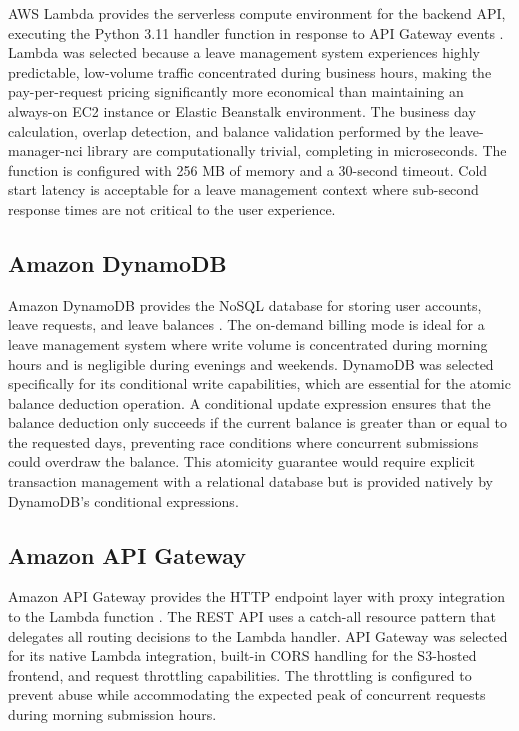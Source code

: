 \documentclass[conference]{IEEEtran}
\begin{document}
AWS Lambda provides the serverless compute environment for the backend API, executing the Python 3.11 handler function in response to API Gateway events \cite{awslambda}. Lambda was selected because a leave management system experiences highly predictable, low-volume traffic concentrated during business hours, making the pay-per-request pricing significantly more economical than maintaining an always-on EC2 instance or Elastic Beanstalk environment. The business day calculation, overlap detection, and balance validation performed by the leave-manager-nci library are computationally trivial, completing in microseconds. The function is configured with 256 MB of memory and a 30-second timeout. Cold start latency is acceptable for a leave management context where sub-second response times are not critical to the user experience.

\subsection{Amazon DynamoDB}

Amazon DynamoDB provides the NoSQL database for storing user accounts, leave requests, and leave balances \cite{awsdynamodb}. The on-demand billing mode is ideal for a leave management system where write volume is concentrated during morning hours and is negligible during evenings and weekends. DynamoDB was selected specifically for its conditional write capabilities, which are essential for the atomic balance deduction operation. A conditional update expression ensures that the balance deduction only succeeds if the current balance is greater than or equal to the requested days, preventing race conditions where concurrent submissions could overdraw the balance. This atomicity guarantee would require explicit transaction management with a relational database but is provided natively by DynamoDB's conditional expressions.

\subsection{Amazon API Gateway}

Amazon API Gateway provides the HTTP endpoint layer with proxy integration to the Lambda function \cite{awsapigateway}. The REST API uses a catch-all resource pattern that delegates all routing decisions to the Lambda handler. API Gateway was selected for its native Lambda integration, built-in CORS handling for the S3-hosted frontend, and request throttling capabilities. The throttling is configured to prevent abuse while accommodating the expected peak of concurrent requests during morning submission hours.
\end{document}
